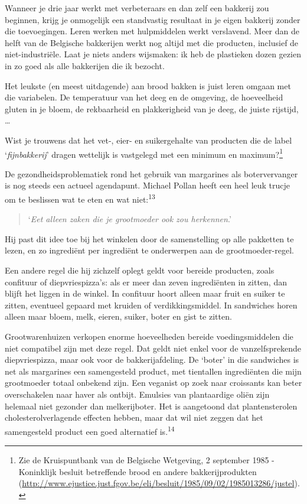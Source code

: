 \documentclass[
  11pt,
  dutch,
]{memoir}
\begin{document}
Wanneer je drie jaar werkt met verbeteraars en dan zelf een bakkerij zou
beginnen, krijg je onmogelijk een standvastig resultaat in je eigen
bakkerij zonder die toevoegingen. Leren werken met hulpmiddelen werkt
verslavend. Meer dan de helft van de Belgische bakkerijen werkt nog
altijd met die producten, inclusief de niet-industriële. Laat je niets
anders wijsmaken: ik heb de plastieken dozen gezien in zo goed als alle
bakkerijen die ik bezocht.

Het leukste (en meest uitdagende) aan brood bakken is juist leren omgaan
met die variabelen. De temperatuur van het deeg en de omgeving, de
hoeveelheid gluten in je bloem, de rekbaarheid en plakkerigheid van je
deeg, de juiste rijstijd, \ldots{}

Wist je trouwens dat het vet-, eier- en suikergehalte van producten die
de label `\emph{fijnbakkerij}' dragen wettelijk is vastgelegd met een
minimum en maximum?\footnote{Zie de Kruispuntbank van de Belgische
  Wetgeving, 2 september 1985 - Koninklijk besluit betreffende brood en
  andere bakkerijprodukten
  (\url{http://www.ejustice.just.fgov.be/eli/besluit/1985/09/02/1985013286/justel}).}

De gezondheidsproblematiek rond het gebruik van margarines als
botervervanger is nog steeds een actueel agendapunt. Michael Pollan
heeft een heel leuk trucje om te beslissen wat te eten en wat
niet:\textsuperscript{13}

\begin{quote}
`\emph{Eet alleen zaken die je grootmoeder ook zou herkennen}.'
\end{quote}

Hij past dit idee toe bij het winkelen door de samenstelling op alle
pakketten te lezen, en zo ingrediënt per ingrediënt te onderwerpen aan
de grootmoeder-regel.

Een andere regel die hij zichzelf oplegt geldt voor bereide producten,
zoals confituur of diepvriespizza's: als er meer dan zeven ingrediënten
in zitten, dan blijft het liggen in de winkel. In confituur hoort alleen
maar fruit en suiker te zitten, eventueel gepaard met kruiden of
verdikkingsmiddel. In sandwiches horen alleen maar bloem, melk, eieren,
suiker, boter en gist te zitten.

Grootwarenhuizen verkopen enorme hoeveelheden bereide voedingsmiddelen
die niet compatibel zijn met deze regel. Dat geldt niet enkel voor de
vanzelfsprekende diepvriespizza, maar ook voor de bakkerijafdeling. De
`boter' in die sandwiches is net als margarines een samengesteld
product, met tientallen ingrediënten die mijn grootmoeder totaal
onbekend zijn. Een veganist op zoek naar croissants kan beter
overschakelen naar haver als ontbijt. Emulsies van plantaardige oliën
zijn helemaal niet gezonder dan melkerijboter. Het is aangetoond dat
plantensterolen cholesterolverlagende effecten hebben, maar dat wil niet
zeggen dat het samengesteld product een goed alternatief
is.\textsuperscript{14}
\end{document}
